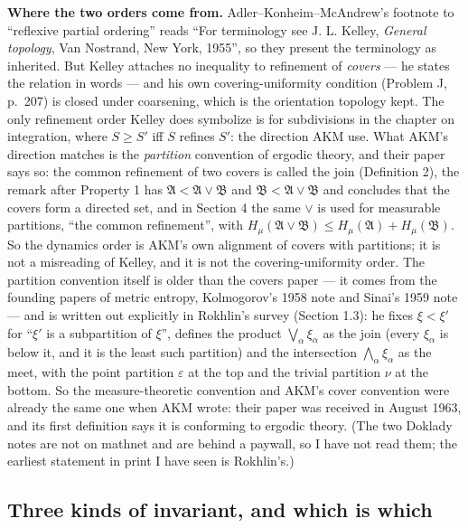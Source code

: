 \documentclass[
]{article}
\begin{document}
\textbf{Where the two orders come from.} Adler--Konheim--McAndrew's
footnote to ``reflexive partial ordering'' reads ``For terminology see
J. L. Kelley, \emph{General topology}, Van Nostrand, New York, 1955'',
so they present the terminology as inherited. But Kelley attaches no
inequality to refinement of \emph{covers} --- he states the relation in
words --- and his own covering-uniformity condition (Problem J, p.~207)
is closed under coarsening, which is the orientation topology kept. The
only refinement order Kelley does symbolize is for subdivisions in the
chapter on integration, where \(S\ge S'\) iff \(S\) refines \(S'\): the
direction AKM use. What AKM's direction matches is the \emph{partition}
convention of ergodic theory, and their paper says so: the common
refinement of two covers is called the join (Definition 2), the remark
after Property 1 has \(\mathfrak{A}<\mathfrak{A}\vee\mathfrak{B}\) and
\(\mathfrak{B}<\mathfrak{A}\vee\mathfrak{B}\) and concludes that the
covers form a directed set, and in Section 4 the same \(\vee\) is used for
measurable partitions, ``the common refinement'', with
\(H_\mu(\mathfrak{A}\vee\mathfrak{B})\le H_\mu(\mathfrak{A})+H_\mu(\mathfrak{B})\).
So the dynamics order is AKM's own alignment of covers with partitions;
it is not a misreading of Kelley, and it is not the covering-uniformity
order. The partition convention itself is older than the covers paper
--- it comes from the founding papers of metric entropy, Kolmogorov's
1958 note and Sinai's 1959 note --- and is written out explicitly in
Rokhlin's survey (Section 1.3): he fixes \(\xi<\xi'\) for ``\(\xi'\) is a
subpartition of \(\xi\)'', defines the product
\(\textstyle\bigvee_\alpha\xi_\alpha\) as the join (every \(\xi_\alpha\)
is below it, and it is the least such partition) and the intersection
\(\textstyle\bigwedge_\alpha\xi_\alpha\) as the meet, with the point
partition \(\varepsilon\) at the top and the trivial partition \(\nu\)
at the bottom. So the measure-theoretic convention and AKM's cover
convention were already the same one when AKM wrote: their paper was
received in August 1963, and its first definition says it is conforming
to ergodic theory. (The two Doklady notes are not on mathnet and are
behind a paywall, so I have not read them; the earliest statement in
print I have seen is Rokhlin's.)

\subsection{Three kinds of invariant, and which is
which}\label{three-kinds-of-invariant-and-which-is-which}
\end{document}
